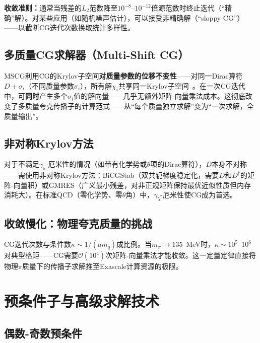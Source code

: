 \documentclass[12pt,a4paper]{ctexart}
\theoremstyle{definition}
\begin{document}
\textbf{收敛准则：}通常当残差的$L_2$范数降至$10^{-8}\text{--}10^{-12}$倍源范数时终止迭代（``精确''解）。对某些应用（如随机噪声估计），可以接受非精确解（``sloppy CG''）——以截断CG迭代次数换取统计多样性。

\subsection{多质量CG求解器（Multi-Shift CG）}

MSCG利用CG的Krylov子空间\textbf{对质量参数的位移不变性}——对同一Dirac算符$D + \sigma_i$（不同质量参数$\sigma_i$），所有解$\chi_i$共享同一Krylov子空间~\cite{GattringerLang2010}。在一次CG迭代中，可\textbf{同时}产生多个$\sigma_i$值的解向量——几乎无额外矩阵-向量乘法成本。这彻底改变了多质量夸克传播子的计算范式——从``每个质量独立求解''变为``一次求解，全质量输出''。

\subsection{非对称Krylov方法}

对于不满足$\gamma_5$-厄米性的情况（如带有化学势或$\theta$项的Dirac算符），$D$本身不对称——需使用非对称Krylov方法：BiCGStab（双共轭梯度稳定化，需要$D$和$D^\dagger$的矩阵-向量积）或GMRES（广义最小残差，对非正规矩阵保持最优近似性质但内存消耗大）。在标准QCD（零化学势、零$\theta$角）中，$\gamma_5$-厄米性使CG成为首选。

\subsection{收敛慢化：物理夸克质量的挑战}

CG迭代次数与条件数$\kappa \sim 1/(a m_q)$成比例。当$m_\pi \to 135$~MeV时，$\kappa \sim 10^5\text{--}10^6$对典型格距——CG需要$\mathcal{O}(10^4)$次矩阵-向量乘法才能收敛。这一定量定律直接将物理$\pi$质量下的传播子求解推至Exascale计算资源的极限。

\section{预条件子与高级求解技术}

\subsection{偶数-奇数预条件}
\end{document}
